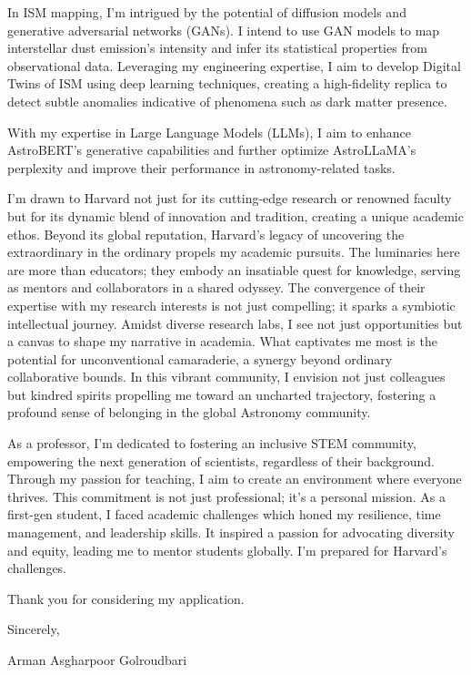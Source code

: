\documentclass[a4,20pt]{article}
\begin{document}
\begin{large}
In ISM mapping, I'm intrigued by the potential of diffusion models and generative adversarial networks (GANs). I intend to use GAN models to map interstellar dust emission's intensity and infer its statistical properties from observational data. Leveraging my engineering expertise, I aim to develop Digital Twins of ISM using deep learning techniques, creating a high-fidelity replica to detect subtle anomalies indicative of phenomena such as dark matter presence.

With my expertise in Large Language Models (LLMs), I aim to enhance AstroBERT’s generative capabilities and further optimize AstroLLaMA’s perplexity and improve their performance in astronomy-related tasks.


I'm drawn to Harvard not just for its cutting-edge research or renowned faculty but for its dynamic blend of innovation and tradition, creating a unique academic ethos. Beyond its global reputation, Harvard's legacy of uncovering the extraordinary in the ordinary propels my academic pursuits. The luminaries here are more than educators; they embody an insatiable quest for knowledge, serving as mentors and collaborators in a shared odyssey. The convergence of their expertise with my research interests is not just compelling; it sparks a symbiotic intellectual journey. Amidst diverse research labs, I see not just opportunities but a canvas to shape my narrative in academia. What captivates me most is the potential for unconventional camaraderie, a synergy beyond ordinary collaborative bounds. In this vibrant community, I envision not just colleagues but kindred spirits propelling me toward an uncharted trajectory, fostering a profound sense of belonging in the global Astronomy community.

As a professor, I'm dedicated to fostering an inclusive STEM community, empowering the next generation of scientists, regardless of their background. Through my passion for teaching, I aim to create an environment where everyone thrives. This commitment is not just professional; it's a personal mission. As a first-gen student, I faced academic challenges which honed my resilience, time management, and leadership skills. It inspired a passion for advocating diversity and equity, leading me to mentor students globally. I'm prepared for Harvard's challenges.



\vspace{0.05cm}
Thank you for considering my application.\vspace{-0.1cm}

Sincerely, \vspace{-0.1cm}

Arman Asgharpoor Golroudbari


\end{large}
\end{document}
